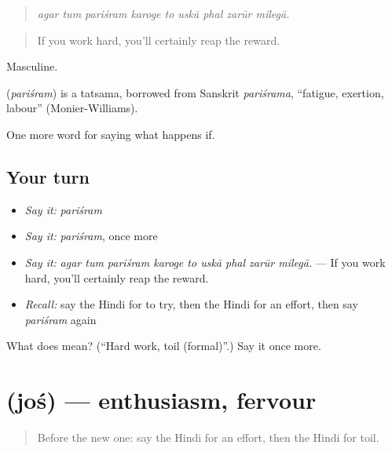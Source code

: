 \begin{quote}
\emph{agar tum pariśram karoge to uskā phal zarūr milegā.}
\end{quote}

\begin{quote}
If you work hard, you'll certainly reap the reward.
\end{quote}

Masculine.

\begin{cousinweb}
\textbf{} (\emph{pariśram}) is a tatsama, borrowed from Sanskrit \emph{pariśrama}, \textquotedblleft{}fatigue, exertion, labour\textquotedblright{} (Monier-Williams).
\end{cousinweb}

\begin{grammarlens}[title={What you've built}]
One more word for saying what happens if.
\end{grammarlens}

\subsection*{Your turn}
\begin{itemize}
\raggedright
  \item \emph{Say it:} \emph{pariśram}
  \item \emph{Say it:} \emph{pariśram}, once more
  \item \emph{Say it:} \emph{agar tum pariśram karoge to uskā phal zarūr milegā.} — If you work hard, you'll certainly reap the reward.
  \item \emph{Recall:} say the Hindi for to try, then the Hindi for an effort, then say \emph{pariśram} again
\end{itemize}

\begin{tcolorbox}[breakable,colback=teal!4,colframe=teal!35!black,title={Before you move on}]
What does  mean? (\textquotedblleft{}Hard work, toil (formal)\textquotedblright{}.) Say it once more.
\end{tcolorbox}
\section[\texorpdfstring{\hi{जोश} (joś)}{जोश (joś)}]{ (joś) — enthusiasm, fervour}

\label{lesson:HI-C391-jos}



\begin{quote}
Before the new one: say the Hindi for an effort, then the Hindi for toil.
\end{quote}

